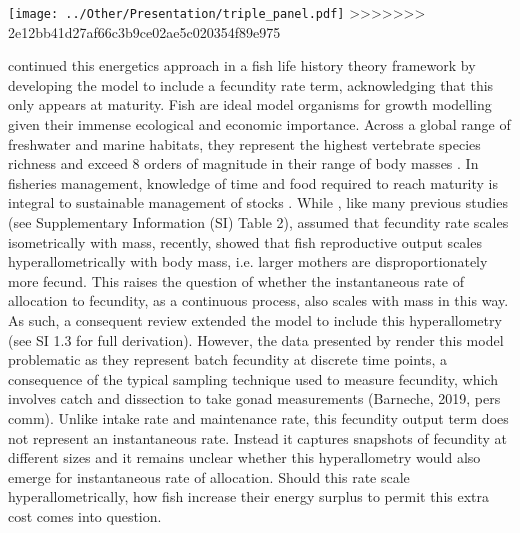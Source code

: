 \documentclass[a4paper]{article} %
\begin{document}
\begin{center}
\begin{minipage}{\linewidth}
    \begin{center}
        \begin{minipage}{\linewidth}
        \texttt{[image: ../Other/Presentation/triple\_panel.pdf]}
>>>>>>> 2e12bb41d27af66c3b9ce02ae5c020354f89e975
        \label{growth_schedules}
        \end{minipage}%
    \end{center}

    \textcite{Charnov2001} continued this energetics approach in a fish life history theory framework by developing the \textcite{West2001} model to include a fecundity rate term, acknowledging that this only appears at maturity. Fish are ideal model organisms for growth modelling given their immense ecological and economic importance. Across a global range of freshwater and marine habitats, they represent the highest vertebrate species richness and exceed 8 orders of magnitude in their range of body masses \autocite{Barneche2018c}. In fisheries management, knowledge of time and food required to reach maturity is integral to sustainable management of stocks \autocite{Szuwalski2017, Barneche2018c}.
    While \textcite{Charnov2001}, like many previous studies (see Supplementary Information (SI) Table 2), assumed that fecundity rate scales isometrically with mass, recently, \textcite{Barneche2018-reproductive_output} showed that fish reproductive output scales hyperallometrically with body mass, i.e. larger mothers are disproportionately more fecund. This raises the question of whether the instantaneous rate of allocation to fecundity, as a continuous process, also scales with mass in this way. As such, a consequent review extended the \textcite{Charnov2001} model to include this hyperallometry \autocite{Marshall2019b} (see SI 1.3 for full derivation). However, the data presented by \textcite{Barneche2018-reproductive_output} render this model problematic as they represent batch fecundity at discrete time points, a consequence of the typical sampling technique used to measure fecundity, which involves catch and dissection to take gonad measurements (Barneche, 2019, pers comm). Unlike intake rate and maintenance rate, this fecundity output term does not represent an instantaneous rate. Instead it captures snapshots of fecundity at different sizes and it remains unclear whether this hyperallometry would also emerge for instantaneous rate of allocation. Should this rate scale hyperallometrically, how fish increase their energy surplus to permit this extra cost comes into question.


\end{minipage}
\end{center}
\end{document}
